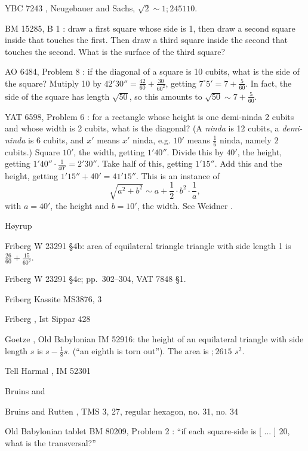 \documentclass{article}
\theoremstyle{definition}
\begin{document}
YBC 7243 \cite[pp.~136--139]{cuneiform}, Neugebauer and Sachs, $\sqrt{2} \sim 1;24 51 10$.

BM 15285, B 1 \cite[p.~54]{thureau-dangin}: draw a first square whose side is 1, then draw 
a second square inside that touches the first. Then draw a third square inside the second that touches the second. 
What is the surface of the third square?

AO 6484, Problem 8 \cite[p.~78]{thureau-dangin}: if the diagonal of a square is 10 cubits, what is the side of the square?
Mutiply 10 by $42'30'' = \frac{42}{60}+\frac{30}{60^2}$, getting
$7^\circ 5'=7+\frac{5}{60}$. In fact, the side of the square has length $\sqrt{50}$, so
this amounts to $\sqrt{50} \sim 7+\frac{5}{60}$. 

YAT 6598, Problem 6 \cite[p.~130]{thureau-dangin}: 
for a rectangle whose height is one demi-ninda  2 cubits and  whose width is 2 cubits, what is the diagonal?
(A  {\em ninda} is 12 cubits, a {\em demi-ninda} is 6 cubits, and $x'$ means $x'$ ninda, e.g.
$10'$ means $\frac{1}{6}$ ninda, namely $2$ cubits.) 
Square $10'$, the width, getting $1'40''$.
Divide this by  $40'$, the height, getting $1'40'' \cdot \frac{1}{40'} = 2'30''$. Take half of this, getting
$1'15''$. Add this and the height, getting  $1'15'' + 40'=41'15''$. This is an instance
of
\[
\sqrt{a^2+b^2} \sim a + \frac{1}{2} \cdot b^2 \cdot \frac{1}{a},
\]
with $a=40'$, the height and  $b=10'$, the width. See Weidner \cite{weidner}.

H{\o}yrup \cite{hoyrup}

Friberg \cite{friberg1997} W 23291 \S 4b: area of equilateral triangle triangle with side length 1 is $\frac{26}{60}+\frac{15}{60^2}$. 

Friberg \cite[p.~286]{friberg1997} W 23291 \S 4c; pp.~302--304, VAT 7848 \S 1.

Friberg \cite{friberg} Kassite MS3876, 3

Friberg \cite[p.~548]{reallexikon7}, Ist Sippar 428

Goetze \cite{goetze}, Old Babylonian IM 52916: the height of an equilateral triangle with side length $s$ is $s-\frac{1}{8}s$. (``an eighth is torn out''). The area is
$;26 15$ $s^2$.

Tell Harmal \cite{TellHarmal}, IM 52301

Bruins \cite{bruins1948} and \cite{bruins1950}

Bruins and Rutten \cite{suse}, TMS 3, 27, regular hexagon, no. 31, no. 34

Old Babylonian tablet BM 80209, Problem 2 \cite{BM80209}:  ``if each square-side is [ ... ] 20, what is the transversal?''
\end{document}

